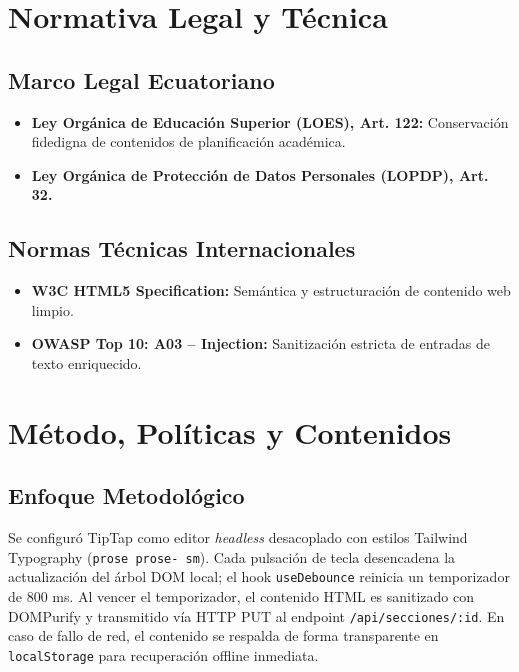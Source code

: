\documentclass[12pt,a4paper]{article}
\begin{document}
\section{Normativa Legal y Técnica}
\subsection{Marco Legal Ecuatoriano}
\begin{itemize}[leftmargin=1.5em, itemsep=2pt]
    \item \textbf{Ley Orgánica de Educación Superior (LOES), Art. 122:} Conservación fidedigna de contenidos de planificación académica.
    \item \textbf{Ley Orgánica de Protección de Datos Personales (LOPDP), Art. 32.}
\end{itemize}
\subsection{Normas Técnicas Internacionales}
\begin{itemize}[leftmargin=1.5em, itemsep=2pt]
    \item \textbf{W3C HTML5 Specification:} Semántica y estructuración de contenido web limpio.
    \item \textbf{OWASP Top 10: A03 -- Injection:} Sanitización estricta de entradas de texto enriquecido.
\end{itemize}

\section{Método, Políticas y Contenidos}
\subsection{Enfoque Metodológico}
Se configuró TipTap como editor \textit{headless} desacoplado con estilos Tailwind Typography (\texttt{prose prose- sm}). Cada pulsación de tecla desencadena la actualización del árbol DOM local; el hook \texttt{useDebounce} reinicia un temporizador de 800 ms. Al vencer el temporizador, el contenido HTML es sanitizado con DOMPurify y transmitido vía HTTP PUT al endpoint \texttt{/\allowbreak  api/\allowbreak  secciones/\allowbreak  :id}. En caso de fallo de red, el contenido se respalda de forma transparente en \texttt{localStorage} para recuperación offline inmediata.
\end{document}
